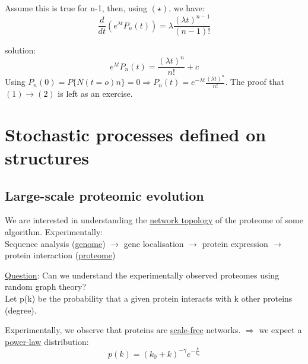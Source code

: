 \documentclass[11pt]{book}
\begin{document}
Assume this is true for n-1, then, using $(\star)$, we have: $$\frac{d}{dt}(e^{\lambda t}P_{n}(t)) = \lambda \frac{(\lambda t)^{n-1}}{(n-1)!}$$

solution: $$e^{\lambda t}P_{n}(t) = \frac{(\lambda t)^{n}}{n!} +c$$
Using $P_{n}(0) = P\{N(t=o)n\}=0 \Rightarrow P_{n}(t)= e^{-\lambda t}\frac{(\lambda t)^{n}}{n!}$. The proof that $(1) \rightarrow (2)$ is left as an exercise.

\section{Stochastic processes defined on structures}

\subsection{Large-scale proteomic evolution}

We are interested in understanding the \underline{network topology} of the proteome of some algorithm. Experimentally:\\ Sequence analysis (\underline{genome}) $\rightarrow$ gene localisation $\rightarrow$ protein expression $\rightarrow$ protein interaction (\underline{proteome})

\underline{Question}: Can we understand the experimentally observed proteomes using random graph theory?\\

Let p(k) be the probability that a given protein interacts with k other proteins (degree).

Experimentally, we observe that proteins are \underline{scale-free} networks. $\Rightarrow$ we expect a \underline{power-law} distribution: $$p(k) = (k_{0} + k)^{-\gamma}e^{-\frac{k}{k_{c}}}$$

\vspace{5 cm}
\end{document}
